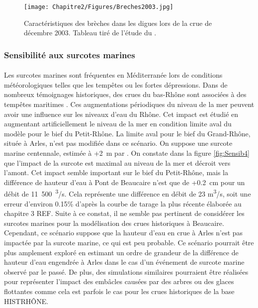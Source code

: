 	\begin{figure}[h]
		\centering
		\texttt{[image: Chapitre2/Figures/Breches2003.jpg]}
        \caption{Caractéristiques des brèches dans les digues lors de la crue de décembre 2003. Tableau tiré de l'étude du \citet{symadrem_programme_2012}.}
		\label{fig:Breches2003}
	\end{figure}		
	
	\subsubsection{Sensibilité aux surcotes marines}	
	
	\paragraph{} Les surcotes marines sont fréquentes en Méditerranée lors de conditions météorologiques telles que les tempêtes ou les fortes dépressions. Dans de nombreux témoignages historiques, des crues du bas-Rhône sont associées à des tempêtes maritimes \citet{pichard_sept_2014}. Ces augmentations périodiques du niveau de la mer peuvent avoir une influence sur les niveaux d'eau du Rhône. Cet impact est étudié en augmentant artificiellement le niveau de la mer en condition limite aval du modèle pour le bief du Petit-Rhône. La limite aval pour le bief du Grand-Rhône, située à Arles, n'est pas modifiée dans ce scénario. On suppose une surcote marine centennale, estimée à +2~m par \citet{kergadallan_estimation_2015}. On constate dans la figure \ref{fig:Sensib4} que l'impact de la surcote est maximal au niveau de la mer et décroit vers l'amont. Cet impact semble important sur le bief du Petit-Rhône, mais la différence de hauteur d'eau à Pont de Beaucaire n'est que de +0.2~cm pour un débit de 11~500~\textsuperscript{3}/s. Cela représente une différence en débit de 23 m\textsuperscript{3}/s, soit une erreur d'environ 0.15\% d'après la courbe de tarage la plus récente élaborée au chapitre 3 REF. Suite à ce constat, il ne semble pas pertinent de considérer les surcotes marines pour la modélisation des crues historiques à Beaucaire. Cependant, ce scénario suppose que la hauteur d'eau en crue à Arles n'est pas impactée par la surcote marine, ce qui est peu probable. Ce scénario pourrait être plus amplement exploré en estimant un ordre de grandeur de la différence de hauteur d'eau engendrée à Arles dans le cas d'un événement de surcote marine observé par le passé. De plus, des simulations similaires pourraient être réalisées pour représenter l'impact des embâcles causées par des arbres ou des glaces flottantes comme cela est parfois le cas pour les crues historiques de la base HISTRHÔNE.
	\FloatBarrier
